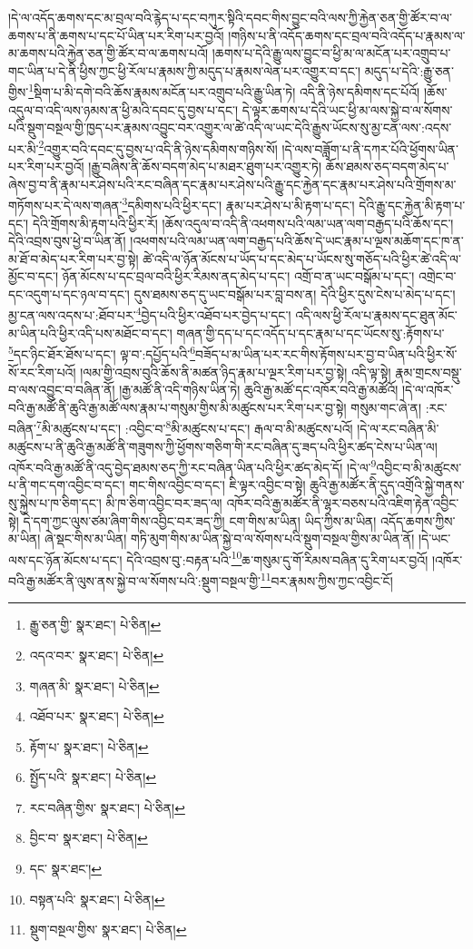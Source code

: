 །དེ་ལ་འདོད་ཆགས་དང་མ་བྲལ་བའི་རྙེད་པ་དང་བཀུར་སྟིའི་དབང་གིས་བྱུང་བའི་ལས་ཀྱི་རྐྱེན་ཅན་གྱི་ཚོར་བ་ལ་ཆགས་པ་ནི་ཆགས་པ་དང་པོ་ཡིན་པར་རིག་པར་བྱའོ། །གཉིས་པ་ནི་འདོད་ཆགས་དང་བྲལ་བའི་འདོད་པ་རྣམས་ལ་མ་ཆགས་པའི་རྐྱེན་ཅན་གྱི་ཚོར་བ་ལ་ཆགས་པའོ། །ཆགས་པ་དེའི་རྒྱུ་ལས་བྱུང་བ་ཕྱི་མ་ལ་མངོན་པར་འགྲུབ་པ་གང་ཡིན་པ་དེ་ནི་ཕྱིས་ཀྱང་ཕྱི་རོལ་པ་རྣམས་ཀྱི་མདུད་པ་རྣམས་ལེན་པར་འགྱུར་བ་དང་། མདུད་པ་དེའི་:རྒྱུ་ཅན་གྱིས་\footnote{རྒྱུ་ཅན་གྱི་  སྣར་ཐང་།  པེ་ཅིན། }སྡིག་པ་མི་དགེ་བའི་ཆོས་རྣམས་མངོན་པར་འགྲུབ་པའི་རྒྱུ་ཡིན་ཏེ། འདི་ནི་ཉེས་དམིགས་དང་པོའོ། །ཆོས་འདུལ་བ་འདི་ལས་ཉམས་ན་ཕྱི་མའི་དབང་དུ་བྱས་པ་དང་། དེ་ལྟར་ཆགས་པ་དེའི་ཡང་ཕྱི་མ་ལས་སྐྱེ་བ་ལ་སོགས་པའི་སྡུག་བསྔལ་གྱི་ཁྱད་པར་རྣམས་འབྱུང་བར་འགྱུར་ལ་ཚེ་འདི་ལ་ཡང་དེའི་རྒྱུས་ཡོངས་སུ་མྱ་ངན་ལས་:འདས་པར་མི་\footnote{འདའ་བར་  སྣར་ཐང་།  པེ་ཅིན། }འགྱུར་བའི་དབང་དུ་བྱས་པ་འདི་ནི་ཉེས་དམིགས་གཉིས་སོ། །དེ་ལས་བཟློག་པ་ནི་དཀར་པོའི་ཕྱོགས་ཡིན་པར་རིག་པར་བྱའོ། །རྒྱུ་བཞིས་ནི་ཆོས་བདག་མེད་པ་མཐར་ཐུག་པར་འགྱུར་ཏེ། ཆོས་ཐམས་ཅད་བདག་མེད་པ་ཞེས་བྱ་བ་ནི་རྣམ་པར་ཤེས་པའི་རང་བཞིན་དང་རྣམ་པར་ཤེས་པའི་རྒྱུ་དང་རྐྱེན་དང་རྣམ་པར་ཤེས་པའི་གྲོགས་མ་གཏོགས་པར་དེ་ལས་གཞན་\footnote{གཞན་མི་  སྣར་ཐང་།  པེ་ཅིན། }དམིགས་པའི་ཕྱིར་དང་། རྣམ་པར་ཤེས་པ་མི་རྟག་པ་དང་། དེའི་རྒྱུ་དང་རྐྱེན་མི་རྟག་པ་དང་། དེའི་གྲོགས་མི་རྟག་པའི་ཕྱིར་རོ། །ཆོས་འདུལ་བ་འདི་ནི་འཕགས་པའི་ལམ་ཡན་ལག་བརྒྱད་པའི་ཆོས་དང་། དེའི་འབྲས་བུས་ཕྱེ་བ་ཡིན་ནོ། །འཕགས་པའི་ལམ་ཡན་ལག་བརྒྱད་པའི་ཆོས་དེ་ཡང་རྣམ་པ་ལྔས་མཆོག་དང་ཁ་ན་མ་ཐོ་བ་མེད་པར་རིག་པར་བྱ་སྟེ། ཚེ་འདི་ལ་ཉོན་མོངས་པ་ཡོད་པ་དང་མེད་པ་ཡོངས་སུ་གཅོད་པའི་ཕྱིར་ཚེ་འདི་ལ་མྱོང་བ་དང་། ཉོན་མོངས་པ་དང་བྲལ་བའི་ཕྱིར་རིམས་ནད་མེད་པ་དང་། འགྲོ་བ་ན་ཡང་བསྒོམ་པ་དང་། འགྲེང་བ་དང་འདུག་པ་དང་ཉལ་བ་དང་། དུས་ཐམས་ཅད་དུ་ཡང་བསྒོམ་པར་བླ་བས་ན། དེའི་ཕྱིར་དུས་ངེས་པ་མེད་པ་དང་། མྱ་ངན་ལས་འདས་པ་:ཐོབ་པར་\footnote{འཐོབ་པར་  སྣར་ཐང་།  པེ་ཅིན། }བྱེད་པའི་ཕྱིར་འཐོབ་པར་བྱེད་པ་དང་། འདི་ལས་ཕྱི་རོལ་པ་རྣམས་དང་ཐུན་མོང་མ་ཡིན་པའི་ཕྱིར་འདི་པས་མཐོང་བ་དང་། གཞན་གྱི་དད་པ་དང་འདོད་པ་དང་རྣམ་པ་དང་ཡོངས་སུ་:རྟོགས་པ་\footnote{རྟོག་པ་  སྣར་ཐང་།  པེ་ཅིན། }དང་ཉིང་ཐོར་ཐོས་པ་དང་། ལྟ་བ་:དཔྱོད་པའི་\footnote{སྤྱོད་པའི་  སྣར་ཐང་།  པེ་ཅིན། }བཟོད་པ་མ་ཡིན་པར་རང་གིས་རྟོགས་པར་བྱ་བ་ཡིན་པའི་ཕྱིར་སོ་སོ་རང་རིག་པའོ། །ལམ་གྱི་འབྲས་བུའི་ཆོས་ནི་མཚན་ཉིད་རྣམ་པ་ལྔར་རིག་པར་བྱ་སྟེ། འདི་ལྟ་སྟེ། རྣམ་གྲངས་བསྡུ་བ་ལས་འབྱུང་བ་བཞིན་ནོ། །རྒྱ་མཚོ་ནི་འདི་གཉིས་ཡིན་ཏེ། ཆུའི་རྒྱ་མཚོ་དང་འཁོར་བའི་རྒྱ་མཚོའོ། །དེ་ལ་འཁོར་བའི་རྒྱ་མཚོ་ནི་ཆུའི་རྒྱ་མཚོ་ལས་རྣམ་པ་གསུམ་གྱིས་མི་མཚུངས་པར་རིག་པར་བྱ་སྟེ། གསུམ་གང་ཞེ་ན། :རང་བཞིན་\footnote{རང་བཞིན་གྱིས་  སྣར་ཐང་།  པེ་ཅིན། }མི་མཚུངས་པ་དང་། :འབྱིང་བ་\footnote{བྱིང་བ་  སྣར་ཐང་།  པེ་ཅིན། }མི་མཚུངས་པ་དང་། རྒལ་བ་མི་མཚུངས་པའོ། །དེ་ལ་རང་བཞིན་མི་མཚུངས་པ་ནི་ཆུའི་རྒྱ་མཚོ་ནི་གཟུགས་ཀྱི་ཕྱོགས་གཅིག་གི་རང་བཞིན་དུ་ཟད་པའི་ཕྱིར་ཚད་ངེས་པ་ཡིན་ལ། འཁོར་བའི་རྒྱ་མཚོ་ནི་འདུ་བྱེད་ཐམས་ཅད་ཀྱི་རང་བཞིན་ཡིན་པའི་ཕྱིར་ཚད་མེད་དོ། །དེ་ལ་\footnote{དང་  སྣར་ཐང་། }འབྱིང་བ་མི་མཚུངས་པ་ནི་གང་དག་འབྱིང་བ་དང་། གང་གིས་འབྱིང་བ་དང་། ཇི་ལྟར་འབྱིང་བ་སྟེ། ཆུའི་རྒྱ་མཚོར་ནི་དུད་འགྲོའི་སྐྱེ་གནས་སུ་སྐྱེས་པ་ཁ་ཅིག་དང་། མི་ཁ་ཅིག་འབྱིང་བར་ཟད་ལ། འཁོར་བའི་རྒྱ་མཚོར་ནི་ལྷར་བཅས་པའི་འཇིག་རྟེན་འབྱིང་སྟེ། དེ་དག་ཀྱང་ལུས་ཙམ་ཞིག་གིས་འབྱིང་བར་ཟད་ཀྱི། ངག་གིས་མ་ཡིན། ཡིད་ཀྱིས་མ་ཡིན། འདོད་ཆགས་ཀྱིས་མ་ཡིན། ཞེ་སྡང་གིས་མ་ཡིན། གཏི་མུག་གིས་མ་ཡིན་སྐྱེ་བ་ལ་སོགས་པའི་སྡུག་བསྔལ་གྱིས་མ་ཡིན་ནོ། །དེ་ཡང་ལས་དང་ཉོན་མོངས་པ་དང་། དེའི་འབྲས་བུ་:བརྟན་པའི་\footnote{བསྟན་པའི་  སྣར་ཐང་།  པེ་ཅིན། }ཆ་གསུམ་དུ་གོ་རིམས་བཞིན་དུ་རིག་པར་བྱའོ། །འཁོར་བའི་རྒྱ་མཚོར་ནི་ལུས་ནས་སྐྱེ་བ་ལ་སོགས་པའི་:སྡུག་བསྔལ་གྱི་\footnote{སྡུག་བསྔལ་གྱིས་  སྣར་ཐང་།  པེ་ཅིན། }བར་རྣམས་ཀྱིས་ཀྱང་འབྱིང་ངོ། 